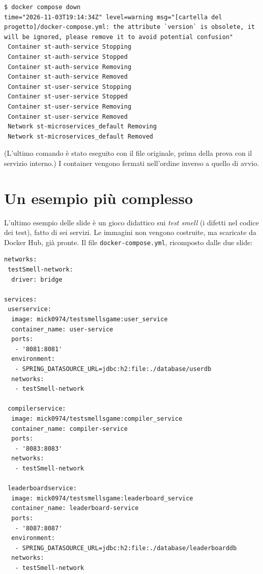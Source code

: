 \begin{lstlisting}[style=shell, name=Terminale]
$ docker compose down
time="2026-11-03T19:14:34Z" level=warning msg="[cartella del progetto]/docker-compose.yml: the attribute `version` is obsolete, it will be ignored, please remove it to avoid potential confusion"
 Container st-auth-service Stopping
 Container st-auth-service Stopped
 Container st-auth-service Removing
 Container st-auth-service Removed
 Container st-user-service Stopping
 Container st-user-service Stopped
 Container st-user-service Removing
 Container st-user-service Removed
 Network st-microservices_default Removing
 Network st-microservices_default Removed
\end{lstlisting}

(L'ultimo comando è stato eseguito con il file originale, prima della prova con il servizio interno.) I container
vengono fermati nell'ordine inverso a quello di avvio.

\section{Un esempio più complesso}

L'ultimo esempio delle slide è un gioco didattico sui \textit{test smell} (i difetti nel codice dei test), fatto di sei
servizi. Le immagini non vengono costruite, ma scaricate da Docker Hub, già pronte. Il file \texttt{docker-compose.yml},
ricomposto dalle due slide:

\begin{lstlisting}[style=yaml, name=docker-compose.yml (1/2)]
networks:
 testSmell-network:
  driver: bridge

services:
 userservice:
  image: mick0974/testsmellsgame:user_service
  container_name: user-service
  ports:
   - '8081:8081'
  environment:
   - SPRING_DATASOURCE_URL=jdbc:h2:file:./database/userdb
  networks:
   - testSmell-network

 compilerservice:
  image: mick0974/testsmellsgame:compiler_service
  container_name: compiler-service
  ports:
   - '8083:8083'
  networks:
   - testSmell-network

 leaderboardservice:
  image: mick0974/testsmellsgame:leaderboard_service
  container_name: leaderboard-service
  ports:
   - '8087:8087'
  environment:
   - SPRING_DATASOURCE_URL=jdbc:h2:file:./database/leaderboarddb
  networks:
   - testSmell-network
\end{lstlisting}

